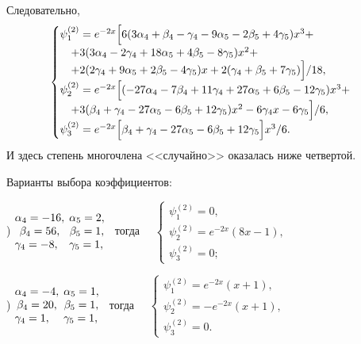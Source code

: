 \documentclass[11pt]{article}
\begin{document}
{Следовательно,
\begin{equation*}
\begin{cases}
\psi_1^{(2)} = e^{-2x} \Bigl[ 
6(3\alpha_4 + \beta_4 - \gamma_4 - 9 \alpha_5 - 2\beta_5 + 4\gamma_5) x^3 + \\
\quad + 3( 3\alpha_4 - 2\gamma_4 + 18 \alpha_5 + 4\beta_5 - 8\gamma_5) x^2 + \\
\quad + 2( 2\gamma_4 + 9\alpha_5 + 2\beta_5 - 4\gamma_5 ) x + 2(\gamma_4 + \beta_5 + 7\gamma_5) \Bigl]/18, \\
\psi_2^{(2)} = e^{-2x} \Bigl[ 
(-27\alpha_4 -7\beta_4 + 11\gamma_4 + 27\alpha_5 + 6\beta_5 - 12\gamma_5) x^3 + \\
\quad + 3( \beta_4 + \gamma_4 - 27\alpha_5 -6\beta_5 + 12\gamma_5 ) x^2 - 6\gamma_4 x - 6\gamma_5 \Bigl]/6, \\
\psi_3^{(2)} = e^{-2x} \Bigl[ 
\beta_4 + \gamma_4 - 27\alpha_5 - 6\beta_5 + 12\gamma_5 \Bigl] x^3 /6.
\end{cases}
\end{equation*}
И здесь степень многочлена <<случайно>> оказалась ниже четвертой.

Варианты выбора коэффициентов:

) $\begin{matrix} \alpha_4 = -16,\hfill\\ \beta_4 = 56,\\ \gamma_4 = -8,\hfill \end{matrix}$
$\begin{matrix} \alpha_5 = 2,\hfill\\ \beta_5 = 1,\\ \gamma_5 = 1,\hfill \end{matrix}$ \ 
тогда \ \ $\begin{cases} 
\psi_1^{(2)} = 0, \\
\psi_2^{(2)} = e^{-2x} (8x - 1), \\
\psi_3^{(2)} = 0;
\end{cases}$

) $\begin{matrix} \alpha_4 = -4,\hfill\\ \beta_4 = 20,\\ \gamma_4 = 1,\hfill \end{matrix}$
$\begin{matrix} \alpha_5 = 1,\hfill\\ \beta_5 = 1,\\ \gamma_5 = 1,\hfill \end{matrix}$ \ 
тогда \ \ $\begin{cases} 
\psi_1^{(2)} = e^{-2x} (x+1), \\
\psi_2^{(2)} = -e^{-2x} (x+1), \\
\psi_3^{(2)} = 0.
\end{cases}$

}
\end{document}
